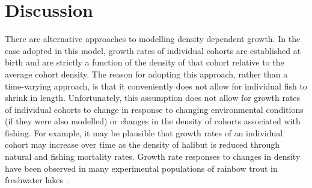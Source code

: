 
\section{Discussion} %
\label{sec:discussion}

There are alternative approaches to modelling density dependent growth.  In the case adopted in this model, growth rates of individual cohorts are established at birth and are strictly a function of the density of that cohort relative to the average cohort density.  The reason for adopting this approach, rather than a time-varying approach, is that it conveniently does not allow for individual fish to shrink in length.  Unfortunately, this assumption does not allow for growth rates of individual cohorts to change in response to changing environmental conditions (if they were also modelled) or changes in the density of cohorts associated with fishing.  For example, it may be plausible that growth rates of an individual cohort may increase over time as the density of halibut is reduced through natural and fishing mortality rates.  Growth rate responses to changes in density have been observed in many experimental populations of rainbow trout in freshwater lakes \citep{post1999density}. 


